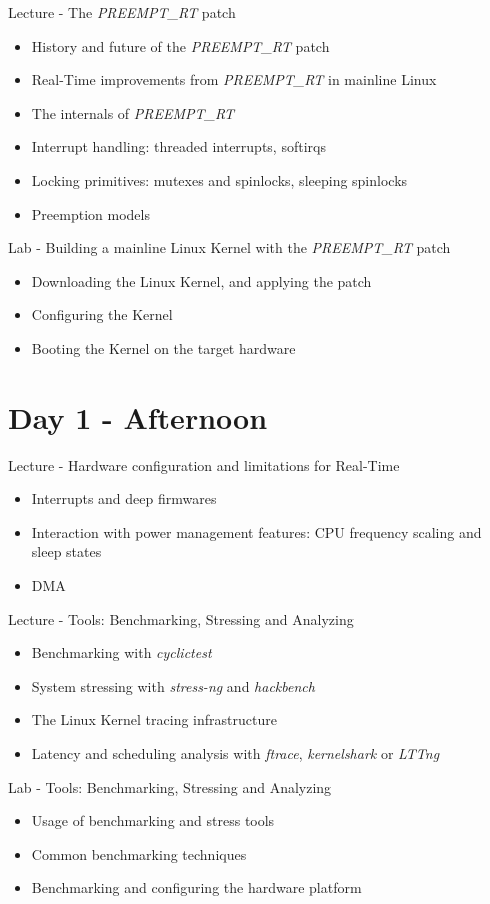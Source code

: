 \documentclass[a4paper,12pt,obeyspaces,spaces,hyphens]{article}
\begin{document}
\feagendatwocolumn
{Lecture - The {\em PREEMPT\_RT} patch}
{
  \begin{itemize}
  \item History and future of the {\em PREEMPT\_RT} patch
  \item Real-Time improvements from {\em PREEMPT\_RT} in mainline Linux
  \item The internals of {\em PREEMPT\_RT}
  \item Interrupt handling: threaded interrupts, softirqs
  \item Locking primitives: mutexes and spinlocks, sleeping spinlocks
  \item Preemption models
  \end{itemize}
}
{Lab - Building a mainline Linux Kernel with the {\em PREEMPT\_RT} patch}
{
  \begin{itemize}
  \item Downloading the Linux Kernel, and applying the patch
  \item Configuring the Kernel
  \item Booting the Kernel on the target hardware
 \end{itemize}
}

\section{Day 1 - Afternoon}

\feagendaonecolumn
{Lecture - Hardware configuration and limitations for Real-Time}
{
  \begin{itemize}
  \item Interrupts and deep firmwares
  \item Interaction with power management features: CPU frequency
    scaling and sleep states
  \item DMA
  \end{itemize}
}

\feagendatwocolumn
{Lecture - Tools: Benchmarking, Stressing and Analyzing}
{
  \begin{itemize}
  \item Benchmarking with {\em cyclictest}
  \item System stressing with {\em stress-ng} and {\em hackbench}
  \item The Linux Kernel tracing infrastructure
  \item Latency and scheduling analysis with {\em ftrace}, {\em
      kernelshark} or {\em LTTng}
  \end{itemize}
}
{Lab - Tools: Benchmarking, Stressing and Analyzing}
{
  \begin{itemize}
  \item Usage of benchmarking and stress tools
  \item Common benchmarking techniques
  \item Benchmarking and configuring the hardware platform
  \end{itemize}
}
\end{document}

